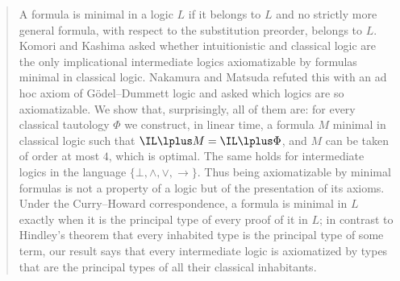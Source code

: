 \begin{abstract}
A formula is minimal in a logic $L$ if it belongs to $L$ and no strictly
more general formula, with respect to the substitution preorder, belongs to
$L$. Komori and Kashima asked whether intuitionistic and classical logic
are the only implicational intermediate logics axiomatizable by formulas
minimal in classical logic. Nakamura and Matsuda refuted this with an
ad hoc axiom of Gödel--Dummett logic and asked which logics are so
axiomatizable. We show that, surprisingly, all of them are: for every
classical tautology $\Phi$ we construct, in linear time, a formula $M$
minimal in classical logic such that $\IL\lplus M=\IL\lplus\Phi$, and $M$
can be taken of order at most $4$, which is optimal. The same holds for
intermediate logics in the language $\{\bot,\wedge,\vee,\to\}$. Thus
being axiomatizable by minimal formulas is not a property of a logic but
of the presentation of its axioms. Under the Curry--Howard
correspondence, a formula is minimal in $L$ exactly when it is the
principal type of every proof of it in $L$; in contrast to Hindley's
theorem that every inhabited type is the principal type of some term, our
result says that every intermediate logic is axiomatized by types that are
the principal types of all their classical inhabitants.
\end{abstract}
